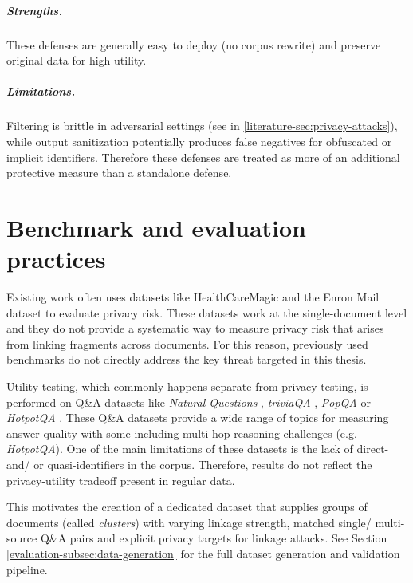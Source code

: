 \subparagraph{Strengths.} These defenses are generally easy to deploy (no corpus rewrite) and preserve original data for high utility. 

\subparagraph{Limitations.} Filtering is brittle in adversarial settings  (see in \ref{literature-sec:privacy-attacks}), while output sanitization potentially produces false negatives for obfuscated or implicit identifiers. Therefore these defenses are treated as more of an additional protective measure than a standalone defense.


\section{Benchmark and evaluation practices}
Existing work often uses datasets like HealthCareMagic and the Enron Mail dataset to evaluate privacy risk. These datasets work at the single-document level and they do not provide a systematic way to measure privacy risk that arises from linking fragments across documents. For this reason, previously used benchmarks do not directly address the key threat targeted in this thesis. 

Utility testing, which commonly happens separate from privacy testing, is performed on Q\&A datasets like \textit{Natural Questions} \cite{NQ}, \textit{triviaQA} \cite{TriviaQA}, \textit{PopQA} \cite{popQA} or \textit{HotpotQA} \cite{hotpotQA}. \cite{LPRAG,goodAndBad,ragSAGE,eraser4RAG,DPVoteRAG} These Q\&A datasets provide a wide range of topics for measuring answer quality with some including multi-hop reasoning challenges (e.g. \textit{HotpotQA}). One of the main limitations of these datasets is the lack of direct- and/ or quasi-identifiers in the corpus. Therefore, results do not reflect the privacy-utility tradeoff present in regular data.

This motivates the creation of a dedicated dataset that supplies groups of documents (called \textit{clusters}) with varying linkage strength, matched single/ multi-source Q\&A pairs and explicit privacy targets for linkage attacks. See Section \ref{evaluation-subsec:data-generation} for the full dataset generation and validation pipeline.


